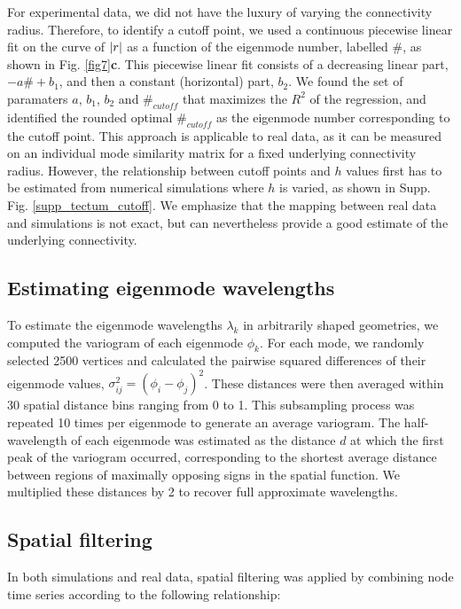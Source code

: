 \documentclass{article}
\begin{document}
For experimental data, we did not have the luxury of varying the connectivity radius. Therefore, to identify a cutoff point, we used a continuous piecewise linear fit on the curve of $\abs{r}$ as a function of the eigenmode number, labelled \#, as shown in Fig. \ref{fig7}\textbf{c}. This piecewise linear fit consists of a decreasing linear part, $-a\#+b_1$, and then a constant (horizontal) part, $b_2$. We found the set of paramaters $a$, $b_1$, $b_2$ and $\#_{cutoff}$ that maximizes the $R^2$ of the regression, and identified the rounded optimal $\#_{cutoff}$ as the eigenmode number corresponding to the cutoff point. This approach is applicable to real data, as it can be measured on an individual mode similarity matrix for a fixed underlying connectivity radius. However, the relationship between cutoff points and $h$ values first has to be estimated from numerical simulations where $h$ is varied, as shown in Supp. Fig. \ref{supp_tectum_cutoff}. We emphasize that the mapping between real data and simulations is not exact, but can nevertheless provide a good estimate of the underlying connectivity.

\subsection*{Estimating eigenmode wavelengths}

To estimate the eigenmode wavelengths $\lambda_k$ in arbitrarily shaped geometries, we computed the variogram of each eigenmode $\phi_k$. For each mode, we randomly selected 2500 vertices and calculated the pairwise squared differences of their eigenmode values, $\sigma^2_{ij}=(\phi_i - \phi_j)^2$. These distances were then averaged within 30 spatial distance bins ranging from 0 to 1. This subsampling process was repeated 10 times per eigenmode to generate an average variogram. The half-wavelength of each eigenmode was estimated as the distance $d$ at which the first peak of the variogram occurred, corresponding to the shortest average distance between regions of maximally opposing signs in the spatial function. We multiplied these distances by 2 to recover full approximate wavelengths.

\subsection*{Spatial filtering}

In both simulations and real data, spatial filtering was applied by combining node time series according to the following relationship:
\end{document}
